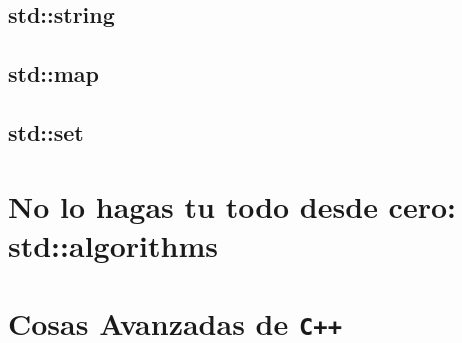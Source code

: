 \documentclass[12pt, fleqn]{report}                             %
\theoremstyle{break}                                            %
\newcommand{\textCode}[1]  { \texttt{#1} }                      %
\newcommand \Cpp  {\textCode{C++} }                               %
\begin{document}
        
        \section{std::string}


        \section{std::map}

        \section{std::set}

    \clearpage
    \chapter{No lo hagas tu todo desde cero: std::algorithms}



    \clearpage
    \chapter{Cosas Avanzadas de \Cpp}

\end{document}
